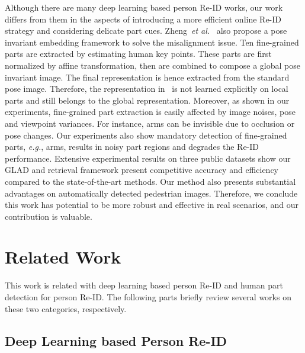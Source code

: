 \documentclass[sigconf]{acmart}
\begin{document}
Although there are many deep learning based person Re-ID works, our work differs from them in the aspects of introducing a more efficient online Re-ID strategy and considering delicate part cues. Zheng~\emph{et al.}~\cite{zheng2017pose} also propose a pose invariant embedding framework to solve the misalignment issue. Ten fine-grained parts are extracted by estimating human key points. These parts are first normalized by affine transformation, then are combined to compose a global pose invariant image. The final representation is hence extracted from the standard pose image. Therefore, the representation in~\cite{zheng2017pose} is not learned explicitly on local parts and still belongs to the global representation. Moreover, as shown in our experiments, fine-grained part extraction is easily affected by image noises, pose and viewpoint variances. For instance, arms can be invisible due to occlusion or pose changes. Our experiments also show mandatory detection of fine-grained parts, \emph{e.g.}, arms, results in noisy part regions and degrades the Re-ID performance. Extensive experimental results on three public datasets show our GLAD and retrieval framework present competitive accuracy and efficiency compared to the state-of-the-art methods. Our method also presents substantial advantages on automatically detected pedestrian images. Therefore, we conclude this work has potential to be more robust and effective in real scenarios, and our contribution is valuable.


\section{Related Work}\label{sec:related}

This work is related with deep learning based person Re-ID and human part detection for person Re-ID. The following parts briefly review several works on these two categories, respectively.

\subsection{Deep Learning based Person Re-ID}
\end{document}

